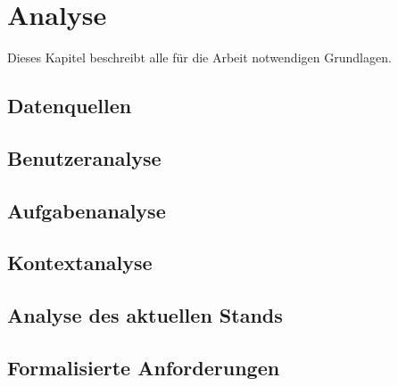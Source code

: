 
\chapter{Analyse}
\label{chapter-analyse}

Dieses Kapitel beschreibt alle für die Arbeit notwendigen Grundlagen.

\section{Datenquellen}

\section{Benutzeranalyse}

\section{Aufgabenanalyse}

\section{Kontextanalyse}

\section{Analyse des aktuellen Stands}

\section{Formalisierte Anforderungen}
